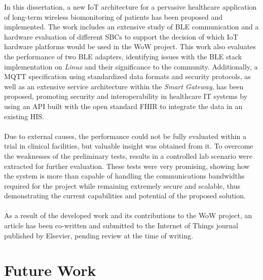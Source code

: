 



In this dissertation, a new \acs{IoT} architecture for a pervasive healthcare application of long-term wireless biomonitoring of patients has been proposed and implemented. The work includes an extensive study of \acs{BLE} communication and a hardware evaluation of different \acs{SBC}s to support the decision of which \acs{IoT} hardware platforms would be used in the \acs{WoW} project. This work also evaluates the performance of two \acs{BLE} adapters, identifying issues with the \acs{BLE} stack implementation on \textit{Linux} and their significance to the community. Additionally, a \acs{MQTT} specification using standardized data formats and security protocols, as well as an extensive service architecture within the \textit{Smart Gateway}, has been proposed, promoting security and interoperability in healthcare \acs{IT} systems by {\color{blue} using} an \acs{API} {\color{blue} built with} the open standard \acs{FHIR} to integrate the data in an existing \acs{HIS}. 

\paragraph{} Due to external causes, the performance could not be fully evaluated within a trial in clinical facilities, but valuable insight was obtained from it. To overcome the weaknesses of the preliminary tests, results in a controlled lab scenario were extracted for further evaluation. These tests were very promising, showing how the system is more than capable of handling the communications bandwidths required for the project while remaining extremely secure and scalable, thus demonstrating the current capabilities and potential of the proposed solution. 

\paragraph{} As a result of the developed work and its contributions to the \acs{WoW} project, an article \cite{Fama2021} has been co-written and submitted to the Internet of Things journal published by Elsevier, pending review at the time of writing. 

\section{Future Work}

